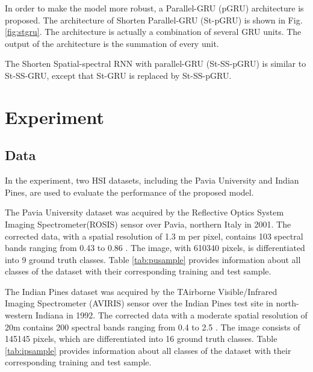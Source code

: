\documentclass[conference]{IEEEtran}
\begin{document}
In order to make the model more robust, a Parallel-GRU (pGRU) architecture is proposed.
The architecture of Shorten Parallel-GRU (St-pGRU) is shown in Fig. \ref{fig:stgru}.
The architecture is actually a combination of several GRU units. The output of the
architecture is the summation of every unit.

The Shorten Spatial-spectral RNN with parallel-GRU (St-SS-pGRU) is similar to St-SS-GRU,
except that St-GRU is replaced by St-SS-pGRU.

\section{Experiment}

\subsection{Data}

In the experiment, two HSI datasets, including the Pavia University and Indian Pines,
are used to evaluate the performance of the proposed model.

The Pavia University dataset was acquired by the Reflective Optics System Imaging
Spectrometer(ROSIS) sensor over Pavia, northern Italy in 2001. The corrected data,
with a spatial resolution of 1.3 m per pixel, contains 103 spectral bands ranging
from 0.43 to 0.86 . The image, with 610340 pixels, is differentiated into
9 ground truth classes. Table \ref{tab:pusample} provides information about all
classes of the dataset with their corresponding training and test sample.

The Indian Pines dataset was acquired by the TAirborne Visible/Infrared Imaging
Spectrometer (AVIRIS) sensor over the Indian Pines test site in north-western
Indiana in 1992. The corrected data with a moderate spatial resolution of 20m
contains 200 spectral bands ranging from 0.4 to 2.5 . The image consists of
145145 pixels, which are differentiated into 16 ground truth classes.
Table \ref{tab:ipsample} provides information about all classes of the dataset
with their corresponding training and test sample.
\end{document}

